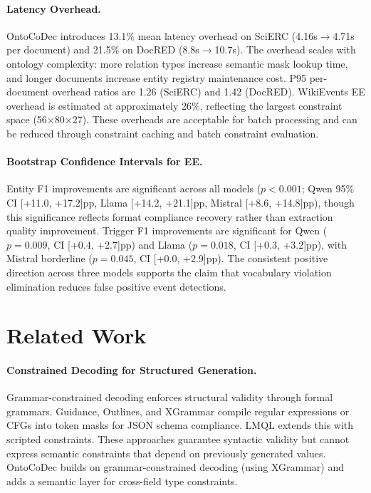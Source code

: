 \documentclass[11pt,a4paper]{article}
\newcommand{\sys}{OntoCoDec}
\begin{document}
\paragraph{Latency Overhead.}
\sys{} introduces 13.1\% mean latency overhead on SciERC (4.16s$\to$4.71s per document) and 21.5\% on DocRED (8.8s$\to$10.7s). The overhead scales with ontology complexity: more relation types increase semantic mask lookup time, and longer documents increase entity registry maintenance cost. P95 per-document overhead ratios are 1.26 (SciERC) and 1.42 (DocRED). WikiEvents EE overhead is estimated at approximately 26\%, reflecting the largest constraint space (56$\times$80$\times$27). These overheads are acceptable for batch processing and can be reduced through constraint caching and batch constraint evaluation.

\paragraph{Bootstrap Confidence Intervals for EE.}
Entity F1 improvements are significant across all models ($p<0.001$; Qwen 95\% CI [+11.0, +17.2]pp, Llama [+14.2, +21.1]pp, Mistral [+8.6, +14.8]pp), though this significance reflects format compliance recovery rather than extraction quality improvement. Trigger F1 improvements are significant for Qwen ($p=0.009$, CI [+0.4, +2.7]pp) and Llama ($p=0.018$, CI [+0.3, +3.2]pp), with Mistral borderline ($p=0.045$, CI [+0.0, +2.9]pp). The consistent positive direction across three models supports the claim that vocabulary violation elimination reduces false positive event detections.

\section{Related Work}
\label{sec:related}

\paragraph{Constrained Decoding for Structured Generation.}
Grammar-constrained decoding enforces structural validity through formal grammars. Guidance, Outlines, and XGrammar compile regular expressions or CFGs into token masks for JSON schema compliance. LMQL extends this with scripted constraints. These approaches guarantee syntactic validity but cannot express semantic constraints that depend on previously generated values. \sys{} builds on grammar-constrained decoding (using XGrammar) and adds a semantic layer for cross-field type constraints.
\end{document}
